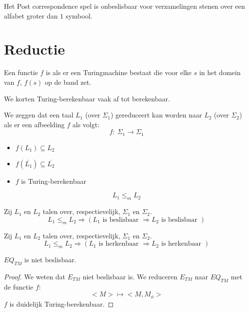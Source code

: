 \documentclass[main.tex]{subfiles}
\begin{document}
\begin{gev}
  Het Post correspondence spel is onbeslisbaar voor verzamelingen stenen over een alfabet groter dan $1$ symbool.
\end{gev}


\section{Reductie}
\label{sec:reductie}

\begin{de}
  Een functie $f$ is  als er een Turingmachine bestaat die voor elke $s$ in het domein van $f$, $f(s)$ op de band zet.
\end{de}

\begin{de}
  We korten Turing-berekenbaar vaak af tot berekenbaar.
\end{de}

\begin{de}
  We zeggen dat een taal $L_1$ (over $\Sigma_1$) gereduceert kan worden naar $L_2$ (over $\Sigma_2$) als er een afbeelding $f$ als volgt:
  \[  f:\ \Sigma_1\rightarrow \Sigma_1  \]
  \begin{itemize}
    \item $f(L_1) \subseteq L_2$
    \item $f(\overline{L_1}) \subseteq \overline{L_2}$
    \item $f$ is Turing-berekenbaar
  \end{itemize}
  \[ L_1\le_m L_2 \]
\end{de}

\begin{st}
  Zij $L_1$ en $L_2$ talen over, respectievelijk, $\Sigma_1$ en $\Sigma_2$.
  \[ L_1\le_m L_2 \Rightarrow (L_1 \text{ is beslisbaar } \Rightarrow L_2 \text{ is beslisbaar }) \]
\end{st}


\begin{st}
  Zij $L_1$ en $L_2$ talen over, respectievelijk, $\Sigma_1$ en $\Sigma_2$.
  \[ L_1\le_m L_2 \Rightarrow (L_1 \text{ is herkenbaar } \Rightarrow L_2 \text{ is herkenbaar }) \]
\end{st}


\begin{st}
  $EQ_{TM}$ is niet beslisbaar.

  \begin{proof}
    We weten dat $E_{TM}$ niet beslisbaar is.
    We reduceren $E_{TM}$ naar $EQ_{TM}$ met de functie $f$:
    \[
    <M> \mapsto <M,M_{\phi}>
    \]
    $f$ is duidelijk Turing-berekenbaar.
\waarom
  \end{proof}
\end{st}
\end{document}
